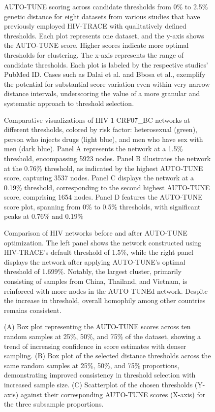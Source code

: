 \documentclass[utf8]{FrontiersinHarvard} %
\begin{document}
\begin{figure}[h!]
	\caption{ AUTO-TUNE scoring across candidate thresholds from 0\% to 2.5\%
		genetic distance for eight datasets from various studies that have previously
		employed HIV-TRACE with qualitatively defined thresholds. Each plot
		represents one dataset, and the y-axis shows the AUTO-TUNE score. Higher
		scores indicate more optimal thresholds for clustering. The x-axis represents
		the range of candidate thresholds. Each plot is labeled by the respective
		studies' PubMed ID. Cases such as Dalai et al. and Bbosa et al., exemplify
		the potential for substantial score variation even within very narrow distance
		intervals, underscoring the value of a more granular and systematic approach to
		threshold selection. }\label{fig:paperComparison} \end{figure}

\begin{figure}[h!]
	\caption{ Comparative visualizations of HIV-1 CRF07\_BC networks at different
		thresholds, colored by risk factor: heterosexual (green), person who injects
		drugs (light blue), and men who have sex with men (dark blue). Panel A
		represents the network at a 1.5\% threshold, encompassing 5923 nodes. Panel B
		illustrates the network at the 0.76\% threshold, as indicated by the highest
		AUTO-TUNE score, capturing 3537 nodes. Panel C displays the network at a
		0.19\% threshold, corresponding to the second highest AUTO-TUNE score,
		comprising 1654 nodes. Panel D features the AUTO-TUNE score plot, spanning
		from 0\% to 0.5\% thresholds, with significant peaks at 0.76\% and 0.19\%
	}\label{fig:chinaScorePlot}
\end{figure}

\begin{figure}[h!]
	\caption{ Comparison of HIV networks before and after AUTO-TUNE optimization.
		The left panel shows the network constructed using HIV-TRACE's default
		threshold of 1.5\%, while the right panel displays the network after applying
		AUTO-TUNE's optimal threshold of 1.699\%. Notably, the largest cluster,
		primarily consisting of samples from China, Thailand, and Vietnam, is
		reinforced with more nodes in the AUTO-TUNEd network. Despite the increase in
		threshold, overall homophily among other countries remains consistent.
	}\label{fig:scoreAbove2}
\end{figure}

\begin{figure}[h!]
	\caption{ (A) Box plot representing the AUTO-TUNE scores across ten random
		samples at 25\%, 50\%, and 75\% of the \citep{rhee_national_2019} dataset,
		showing a trend of increasing confidence in score estimates with denser
		sampling. (B) Box plot of the selected distance thresholds across the same
		random samples at 25\%, 50\%, and 75\% proportions, demonstrating improved
		consistency in threshold selection with increased sample size. (C)
		Scatterplot of the chosen thresholds (Y-axis) against their corresponding
		AUTO-TUNE scores (X-axis) for the three subsample proportions.
	}\label{fig:subsampling}
\end{figure}
\end{document}
